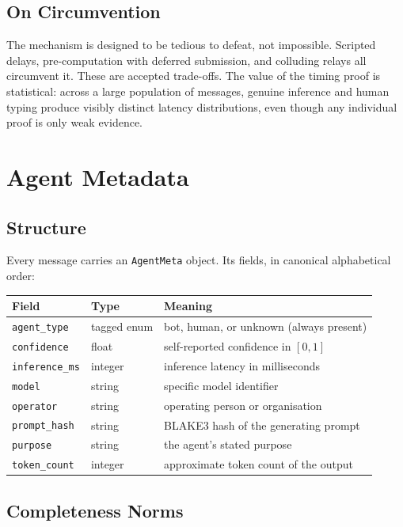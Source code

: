 \documentclass[11pt,a4paper]{article}
\begin{document}
\subsection{On Circumvention}

The mechanism is designed to be tedious to defeat, not impossible. Scripted delays, pre-computation with deferred submission, and colluding relays all circumvent it. These are accepted trade-offs. The value of the timing proof is statistical: across a large population of messages, genuine inference and human typing produce visibly distinct latency distributions, even though any individual proof is only weak evidence.

\section{Agent Metadata}
\label{sec:meta}

\subsection{Structure}

Every message carries an \texttt{AgentMeta} object. Its fields, in canonical alphabetical order:

\begin{longtable}{@{}lll@{}}
\toprule
\textbf{Field} & \textbf{Type} & \textbf{Meaning} \\
\midrule
\texttt{agent\_type} & tagged enum & bot, human, or unknown (always present) \\
\texttt{confidence} & float & self-reported confidence in $[0,1]$ \\
\texttt{inference\_ms} & integer & inference latency in milliseconds \\
\texttt{model} & string & specific model identifier \\
\texttt{operator} & string & operating person or organisation \\
\texttt{prompt\_hash} & string & BLAKE3 hash of the generating prompt \\
\texttt{purpose} & string & the agent's stated purpose \\
\texttt{token\_count} & integer & approximate token count of the output \\
\bottomrule
\end{longtable}

\subsection{Completeness Norms}
\end{document}
